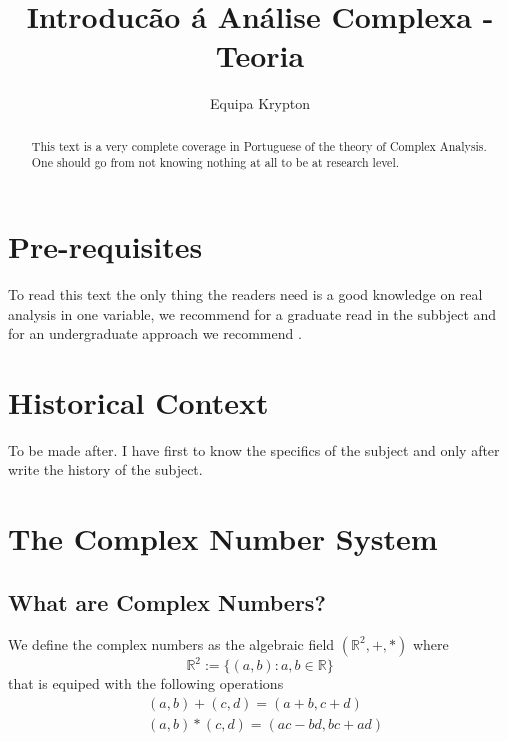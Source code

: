 \documentclass{article}
\title{Introducão á Análise Complexa - Teoria}
\author{Equipa Krypton}
\begin{document}


\maketitle

\begin{abstract}
    This text is a very complete coverage in Portuguese of the theory of Complex Analysis.
    One should go from not knowing nothing at all to be at research level.
\end{abstract}

\section{Pre-requisites}
To read this text the only thing the readers need is a good knowledge on real analysis in
one variable, we recommend for a graduate read in the subbject \cite{rudin_principles_1976}
and for an undergraduate approach we recommend \cite{abbott_understanding_2015}.

\section{Historical Context}
To be made after. I have first to know the specifics of the subject and only after
write the history of the subject.

\section{The Complex Number System}

\subsection{What are Complex Numbers?}

\begin{definition}
    We define the complex numbers as the algebraic field $(\mathbb{R}^2,+,*)$ where
    $$
    \mathbb{R}^2 := \{(a,b) : a,b \in \mathbb{R}\}
    $$
    that is equiped with the following operations
    \begin{align*}
        & (a,b) + (c,d) = (a+b,c+d) \\
        & (a,b) * (c,d) = (ac-bd,bc+ad)
    \end{align*}
\end{definition}
\end{document}
